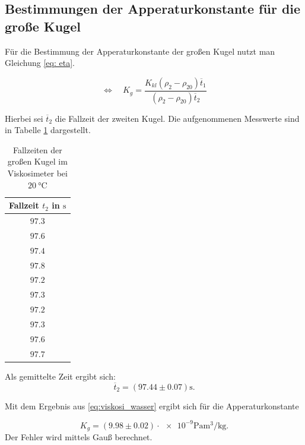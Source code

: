\subsection{Bestimmungen der Apperaturkonstante für die große Kugel}
Für die Bestimmung der Apperaturkonstante der großen Kugel nutzt man Gleichung \eqref{eq: eta}.

\begin{equation*}
\Leftrightarrow \quad K_{g}=\frac{K_{kl}\left(\rho_2-\rho_{20}\right)\overline{t}_1}{\left(\rho_2-\rho_{20}\right)\overline{t}_2}
\end{equation*}

Hierbei sei $\overline{t}_2$ die Fallzeit der zweiten Kugel.
Die aufgenommenen Messwerte sind in Tabelle \ref{tab:messwerte_fallzeit_kugel_gross} dargestellt.

\begin{table}
\centering
\begin{tabular} {c}
  \toprule
  Fallzeit $t_2$ in $\si{\second}$ \\
  \midrule
  $\num{97.3}$ \\
  $\num{97.6}$ \\
  $\num{97.4}$ \\
  $\num{97.8}$ \\
  $\num{97.2}$ \\
  $\num{97.3}$ \\
  $\num{97.2}$ \\
  $\num{97.3}$ \\
  $\num{97.6}$ \\
  $\num{97.7}$ \\
\bottomrule
\end{tabular}
\caption{Fallzeiten der großen Kugel im Viskosimeter bei $\SI{20}{\degreeCelsius}$}
\label{tab:messwerte_fallzeit_kugel_gross}
\end{table}

Als gemittelte Zeit ergibt sich:
\begin{equation}
\label{eq:gemittelte_fallzeit_gross}
\overline{t}_{2}=\left(\num{97.44}\pm\num{0.07}\right) \si{\second}.
\end{equation}

Mit dem Ergebnis aus \eqref{eq:viskosi_wasser} ergibt sich für die
Apperaturkonstante

\begin{equation}
\label{eq:app_konst_gross}
K_{g}=\left(\num{9.98}\pm\num{0.02}\right)\cdot{\num{e-9}} \si{\pascal\cubic\meter\per\kilogram}.
\end{equation}
Der Fehler wird mittels Gauß berechnet.

